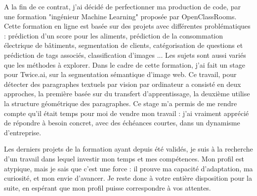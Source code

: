 \documentclass[a4paper,11pt]{article}
\begin{document}
A la fin de ce contrat, j'ai décidé de perfectionner ma production de code, par une formation "ingénieur Machine Learning" proposée par OpenClassRooms. Cette formation en ligne est basée sur des projets avec différentes problématiques : prédiction d'un score pour les aliments, prédiction de la consommation électrique de bâtiments, segmentation de clients, catégorisation de questions et prédiction de tags associés, classification d'images ... Les sujets sont aussi variés que les méthodes à explorer. Dans le cadre de cette formation, j'ai fait un stage pour Twice.ai, sur la segmentation sémantique d'image web. Ce travail, pour détecter des paragraphes textuels par vision par ordinateur a consisté en deux approches, la première basée sur du transfert d'apprentissage, la deuxième utilise la structure géométrique des paragraphes. Ce stage m'a permis de me rendre compte qu'il était temps pour moi de vendre mon travail : j'ai vraiment apprécié de répondre à besoin concret, avec des échéances courtes, dans un dynamisme d'entreprise. 

Les derniers projets de la formation ayant depuis été validés, je suis à la recherche d'un travail dans lequel investir mon temps et mes compétences. Mon profil est atypique, mais je sais que c'est une force : il prouve ma capacité d'adaptation, ma curiosité, et mon envie d'avancer. 
%
Je reste donc à votre entière disposition pour la suite, en espérant que mon profil puisse correspondre à vos attentes. \\
 
\end{document}

